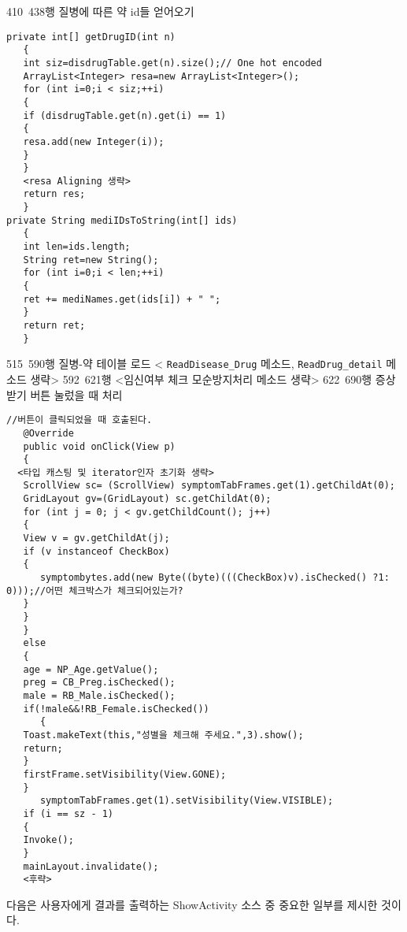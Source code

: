 \documentclass{report}
\begin{document}
410~438행 질병에 따른 약 id들 얻어오기
\begin{verbatim}
private int[] getDrugID(int n)
   {
   int siz=disdrugTable.get(n).size();// One hot encoded
   ArrayList<Integer> resa=new ArrayList<Integer>();
   for (int i=0;i < siz;++i)
   {
   if (disdrugTable.get(n).get(i) == 1)
   {
   resa.add(new Integer(i));
   }
   }
   <resa Aligning 생략>
   return res; 
   }
private String mediIDsToString(int[] ids)
   {
   int len=ids.length;
   String ret=new String();
   for (int i=0;i < len;++i)
   {
   ret += mediNames.get(ids[i]) + " ";
   }
   return ret;
   }
\end{verbatim}
515~590행 질병-약 테이블 로드
< \lstinline{ReadDisease_Drug} 메소드, \lstinline{ReadDrug_detail} 메소드 생략>
592~621행 <임신여부 체크 모순방지처리 메소드 생략>
622~690행 증상 받기 버튼 눌렀을 때 처리
\begin{verbatim}
//버튼이 클릭되었을 때 호출된다.
   @Override
   public void onClick(View p)
   {
  <타입 캐스팅 및 iterator인자 초기화 생략>
   ScrollView sc= (ScrollView) symptomTabFrames.get(1).getChildAt(0);
   GridLayout gv=(GridLayout) sc.getChildAt(0);
   for (int j = 0; j < gv.getChildCount(); j++)
   {
   View v = gv.getChildAt(j);
   if (v instanceof CheckBox)
   {
      symptombytes.add(new Byte((byte)(((CheckBox)v).isChecked() ?1: 0)));//어떤 체크박스가 체크되어있는가?
   }
   }
   }
   else
   {
   age = NP_Age.getValue();
   preg = CB_Preg.isChecked();
   male = RB_Male.isChecked();
   if(!male&&!RB_Female.isChecked())
      {
   Toast.makeText(this,"성별을 체크해 주세요.",3).show();
   return;
   }
   firstFrame.setVisibility(View.GONE);
   }
      symptomTabFrames.get(1).setVisibility(View.VISIBLE);
   if (i == sz - 1)
   {
   Invoke();
   }
   mainLayout.invalidate();
   <후략>
   \end{verbatim}
다음은 사용자에게 결과를 출력하는 ShowActivity 소스 중 중요한 일부를 제시한 것이다.
\end{document}
